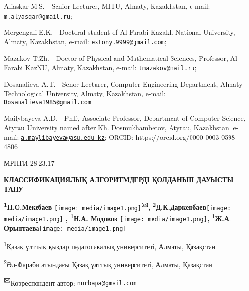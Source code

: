 \documentclass[
]{article}
\begin{document}
Aliaskar M.S. - Senior Lecturer, MITU, Almaty, Kazakhstan, e-mail:
\href{mailto:m.alyasqar@gmail.ru}{\nolinkurl{m.alyasqar@gmail.ru}};

Mergengali E.K. - Doctoral student of Al-Farabi Kazakh National
University, Almaty, Kazakhstan, e-mail:
\href{mailto:estony.9999@gmail.com}{\nolinkurl{estony.9999@gmail.com}};

Mazakov T.Zh. - Doctor of Physical and Mathematical Sciences, Professor,
Al-Farabi KazNU, Almaty, Kazakhstan, e-mail:
\href{mailto:tmazakov@mail.ru}{\nolinkurl{tmazakov@mail.ru}};

Dosanalieva A.T. - Senor Lecturer, Computer Engineering Department,
Almaty Technological University, Almaty, Kazakhstan, e-mail:
\href{mailto:Dosanalieva1985@gmail.com}{\nolinkurl{Dosanalieva1985@gmail.com}}

Mailybayeva A.D. - PhD, Associate Professor, Department of Computer
Science, Atyrau University named after Kh. Dosmukhambetov, Atyrau,
Kazakhstan, e-mail:
\href{mailto:a.maylibayeva@asu.edu.kz}{\nolinkurl{a.maylibayeva@asu.edu.kz}};
ORCID: https://orcid.org/0000-0003-0598-4806

МРНТИ 28.23.17

\textbf{КЛАССИФИКАЦИЯЛЫҚ АЛГОРИТМДЕРДІ ҚОЛДАНЫП ДАУЫСТЫ ТАНУ}

\textbf{\textsuperscript{1}Н.О.Мекебаев}
\texttt{[image: media/image1.png]}\textbf{\textsuperscript{🖂},
\textsuperscript{2}Д.К.Даркенбаев}\texttt{[image: media/image1.png]}
\textbf{, \textsuperscript{1}Н.А. Модовов}
\texttt{[image: media/image1.png]}\textbf{,
\textsuperscript{1}Ж.А.
Орынтаева}\texttt{[image: media/image1.png]}

\textsuperscript{1}Қазақ ұлттық қыздар педагогикалық университеті,
Алматы, Қазақстан

\textsuperscript{2}Әл-Фараби атындағы Қазақ ұлттық университеті, Алматы,
Қазақстан

\textbf{\textsuperscript{🖂}}Корреспондент-автор:
\ul{\href{mailto:nurbapa@gmail.com}{\nolinkurl{nurbapa@gmail.com}}}
\end{document}

